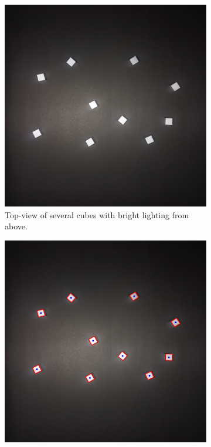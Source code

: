 \begin{figure}[H]
    \centering
    \begin{subfigure}[b]{0.45\textwidth}
         \includegraphics[width=\textwidth]{figures/202106/multiple-cubes.jpg}
         \caption{Top-view of several cubes with bright lighting from above.}
         \label{fig:multiple-cubes}
    \end{subfigure}
    \begin{subfigure}[b]{0.45\textwidth}
         \includegraphics[width=\textwidth]{figures/202106/multiple-cube-centroids.jpg}

\end{subfigure}
\end{figure}
